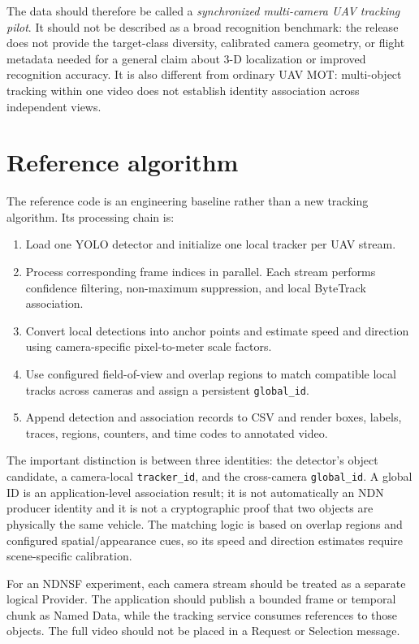 \documentclass[10pt,a4paper]{article}
\newcommand{\code}[1]{\texttt{\small #1}}
\begin{document}
The data should therefore be called a \emph{synchronized multi-camera UAV
tracking pilot}. It should not be described as a broad recognition benchmark:
the release does not provide the target-class diversity, calibrated camera
geometry, or flight metadata needed for a general claim about 3-D localization
or improved recognition accuracy. It is also different from ordinary UAV MOT:
multi-object tracking within one video does not establish identity association
across independent views.

\clearpage
\section{Reference algorithm}

The reference code is an engineering baseline rather than a new tracking
algorithm. Its processing chain is:

\begin{enumerate}
  \item Load one YOLO detector and initialize one local tracker per UAV stream.
  \item Process corresponding frame indices in parallel. Each stream performs
        confidence filtering, non-maximum suppression, and local ByteTrack
        association.
  \item Convert local detections into anchor points and estimate speed and
        direction using camera-specific pixel-to-meter scale factors.
  \item Use configured field-of-view and overlap regions to match compatible
        local tracks across cameras and assign a persistent \code{global\_id}.
  \item Append detection and association records to CSV and render boxes,
        labels, traces, regions, counters, and time codes to annotated video.
\end{enumerate}

The important distinction is between three identities: the detector's object
candidate, a camera-local \code{tracker\_id}, and the cross-camera
\code{global\_id}. A global ID is an application-level association result; it
is not automatically an NDN producer identity and it is not a cryptographic
proof that two objects are physically the same vehicle. The matching logic is
based on overlap regions and configured spatial/appearance cues, so its speed
and direction estimates require scene-specific calibration.

For an NDNSF experiment, each camera stream should be treated as a separate
logical Provider. The application should publish a bounded frame or temporal
chunk as Named Data, while the tracking service consumes references to those
objects. The full video should not be placed in a Request or Selection
message.
\end{document}
